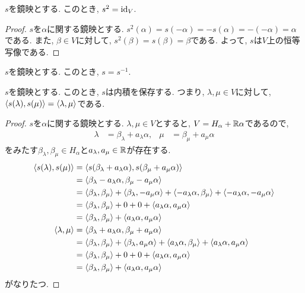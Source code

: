 \begin{prop}
  $s$を鏡映とする.
  このとき, $s^2=\operatorname{id}_V$.
\end{prop}
\begin{proof}
  $s$を$\alpha$に関する鏡映とする.
  $s^2(\alpha)=s(-\alpha)=-s(\alpha)=-(-\alpha)=\alpha$
  である.
  また, $\beta\in V$に対して,
  $s^2(\beta)=s(\beta)=\beta$である.
  よって,
  $s$は$V$上の恒等写像である.
\end{proof}

\begin{cor}
  $s$を鏡映とする.
  このとき, $s=s^{-1}$.
\end{cor}


\begin{prop}
  \label{prop:reflisortho}
  $s$を鏡映とする.
  このとき, $s$は内積を保存する.
  つまり, $\lambda,\mu\in V$に対して, $\Braket{s(\lambda),s(\mu)}=\Braket{\lambda,\mu}$である.
\end{prop}
\begin{proof}
  $s$を$\alpha$に関する鏡映とする.
  $\lambda,\mu\in V$とすると,
  $V=H_\alpha+\mathbb{R}\alpha$であるので,
  \begin{align*}
    \lambda &= \beta_\lambda + a_\lambda \alpha, 
    &\mu &= \beta_\mu + a_\mu \alpha 
  \end{align*}
  をみたす$\beta_\lambda, \beta_\mu \in H_\alpha$と$a_\lambda,a_\mu \in \mathbb{R}$が存在する.
  \begin{align*}
    \Braket{s(\lambda),s(\mu)}&=
    \Braket{s(\beta_\lambda + a_\lambda \alpha), s(\beta_\mu + a_\mu \alpha) }\\
    &=
    \Braket{\beta_\lambda - a_\lambda \alpha, \beta_\mu - a_\mu \alpha }\\
    &=
    \Braket{\beta_\lambda , \beta_\mu  }
    +\Braket{\beta_\lambda ,  - a_\mu \alpha }
    +\Braket{ - a_\lambda \alpha, \beta_\mu }
    +\Braket{ - a_\lambda \alpha, - a_\mu \alpha }\\
    &=
    \Braket{\beta_\lambda , \beta_\mu  }
    +0
    +0
    +\Braket{ a_\lambda \alpha, a_\mu \alpha }\\
    &=
    \Braket{\beta_\lambda , \beta_\mu  }
    +\Braket{ a_\lambda \alpha, a_\mu \alpha }\\
    \Braket{\lambda,\mu}&=
    \Braket{\beta_\lambda + a_\lambda \alpha, \beta_\mu + a_\mu \alpha }\\
    &=
    \Braket{\beta_\lambda , \beta_\mu  }
    +\Braket{\beta_\lambda ,  a_\mu \alpha }
    +\Braket{a_\lambda \alpha, \beta_\mu }
    +\Braket{a_\lambda \alpha, a_\mu \alpha }\\
    &=
    \Braket{\beta_\lambda , \beta_\mu  }
    +0
    +0
    +\Braket{ a_\lambda \alpha, a_\mu \alpha }\\
    &=
    \Braket{\beta_\lambda , \beta_\mu  }
    +\Braket{ a_\lambda \alpha, a_\mu \alpha }
  \end{align*}
  がなりたつ. 
\end{proof}

